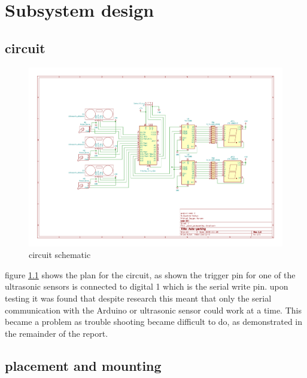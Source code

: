 





\tableofcontents


	\chapter{Subsystem design}

\section{circuit}

\begin{figure}[h]%
	\label{fig:schematic}
	\begin{center}
	\includegraphics[width = 1\textwidth]{"assets/schematicAPS"}
	\caption{circuit schematic}
	\end{center}
\end{figure}

figure \ref{fig:schematic} shows the plan for the circuit, as shown the trigger pin for one of the ultrasonic sensors is connected to digital 1 which is the serial write pin. upon testing it was found that despite research this meant that only the serial communication with the Arduino or ultrasonic sensor could work at a time. This became a problem as trouble shooting became  difficult to do, as demonstrated in the remainder of the report.

\section{placement and mounting}

